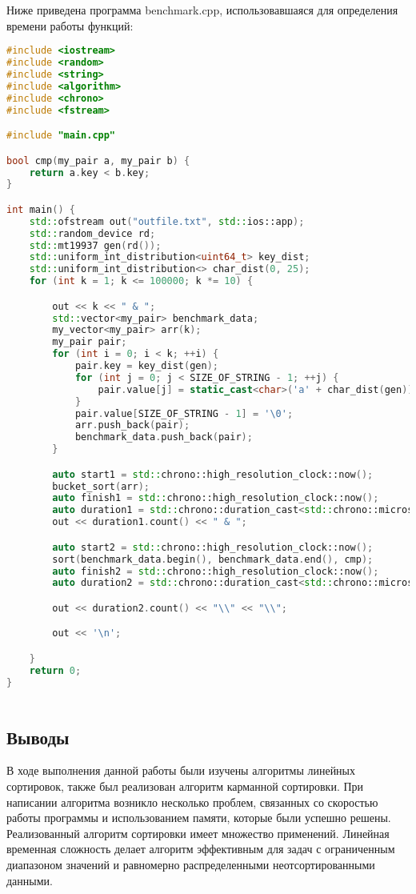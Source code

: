 \documentclass[12pt]{article}
\begin{document}
Ниже приведена программа benchmark.cpp, использовавшаяся для определения времени работы функций:
\begin{lstlisting}[language=C++]
#include <iostream>
#include <random>
#include <string>
#include <algorithm>
#include <chrono>
#include <fstream>

#include "main.cpp"

bool cmp(my_pair a, my_pair b) {
    return a.key < b.key;
}

int main() {
    std::ofstream out("outfile.txt", std::ios::app);
    std::random_device rd;
    std::mt19937 gen(rd());
    std::uniform_int_distribution<uint64_t> key_dist;
    std::uniform_int_distribution<> char_dist(0, 25);
    for (int k = 1; k <= 100000; k *= 10) {

        out << k << " & ";
        std::vector<my_pair> benchmark_data;
        my_vector<my_pair> arr(k);
        my_pair pair;
        for (int i = 0; i < k; ++i) {
            pair.key = key_dist(gen);
            for (int j = 0; j < SIZE_OF_STRING - 1; ++j) {
                pair.value[j] = static_cast<char>('a' + char_dist(gen));
            }
            pair.value[SIZE_OF_STRING - 1] = '\0';
            arr.push_back(pair);
            benchmark_data.push_back(pair);
        }

        auto start1 = std::chrono::high_resolution_clock::now();
        bucket_sort(arr);
        auto finish1 = std::chrono::high_resolution_clock::now();
        auto duration1 = std::chrono::duration_cast<std::chrono::microseconds>(finish1 - start1);
        out << duration1.count() << " & ";

        auto start2 = std::chrono::high_resolution_clock::now();
        sort(benchmark_data.begin(), benchmark_data.end(), cmp);
        auto finish2 = std::chrono::high_resolution_clock::now();
        auto duration2 = std::chrono::duration_cast<std::chrono::microseconds>(finish2 - start2);

        out << duration2.count() << "\\" << "\\";

        out << '\n';

    }
    return 0;
}



\end{lstlisting}

\subsection*{Выводы}

В ходе выполнения данной работы были изучены алгоритмы линейных сортировок, также был реализован алгоритм карманной сортировки. При написании алгоритма возникло несколько проблем, связанных со скоростью работы программы и использованием памяти, которые были успешно решены. Реализованный алгоритм сортировки имеет множество применений. Линейная временная сложность делает алгоритм эффективным для задач с ограниченным диапазоном значений и равномерно распределенными неотсортированными данными.
\end{document}
